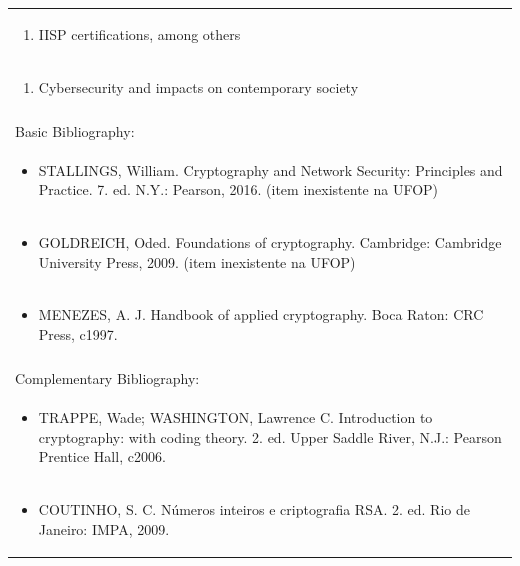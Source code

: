 \documentclass[11pt]{article}
\begin{document}
\begin{center}
\begin{longtable}{|p{4cm}|p{4cm}|p{4cm}|p{4cm}|}
\multicolumn{4}{|p{\dimexpr 16cm + 6\tabcolsep\relax}|}{\begin{enumerate}[start=11]\item IISP certifications, among others\end{enumerate}}\\
\multicolumn{4}{|p{\dimexpr 16cm + 6\tabcolsep\relax}|}{\begin{enumerate}[start=12]\item Cybersecurity and impacts on contemporary society\end{enumerate}}\\
\multicolumn{4}{|p{\dimexpr 16cm + 6\tabcolsep\relax}|}{}\\
\hline
\multicolumn{4}{|p{16cm}|}{Basic Bibliography:}\\*
\multicolumn{4}{|p{\dimexpr 16cm + 6\tabcolsep\relax}|}{\begin{itemize}\item STALLINGS, William. Cryptography and Network Security: Principles and Practice. 7. ed. N.Y.: Pearson, 2016. (item inexistente na UFOP)\end{itemize}}\\
\multicolumn{4}{|p{\dimexpr 16cm + 6\tabcolsep\relax}|}{\begin{itemize}\item GOLDREICH, Oded. Foundations of cryptography. Cambridge: Cambridge University Press, 2009. (item inexistente na UFOP)\end{itemize}}\\
\multicolumn{4}{|p{\dimexpr 16cm + 6\tabcolsep\relax}|}{\begin{itemize}\item MENEZES, A. J. Handbook of applied cryptography. Boca Raton: CRC Press, c1997.\end{itemize}}\\
\multicolumn{4}{|p{16cm}|}{}\\
\hline
\multicolumn{4}{|p{16cm}|}{Complementary Bibliography:}\\*
\multicolumn{4}{|p{\dimexpr 16cm + 6\tabcolsep\relax}|}{\begin{itemize}\item TRAPPE, Wade; WASHINGTON, Lawrence C. Introduction to cryptography: with coding theory. 2. ed. Upper Saddle River, N.J.: Pearson Prentice Hall, c2006.\end{itemize}}\\
\multicolumn{4}{|p{\dimexpr 16cm + 6\tabcolsep\relax}|}{\begin{itemize}\item COUTINHO, S. C. Números inteiros e criptografia RSA. 2. ed. Rio de Janeiro: IMPA, 2009.\end{itemize}}\\

\end{longtable}
\end{center}
\end{document}
